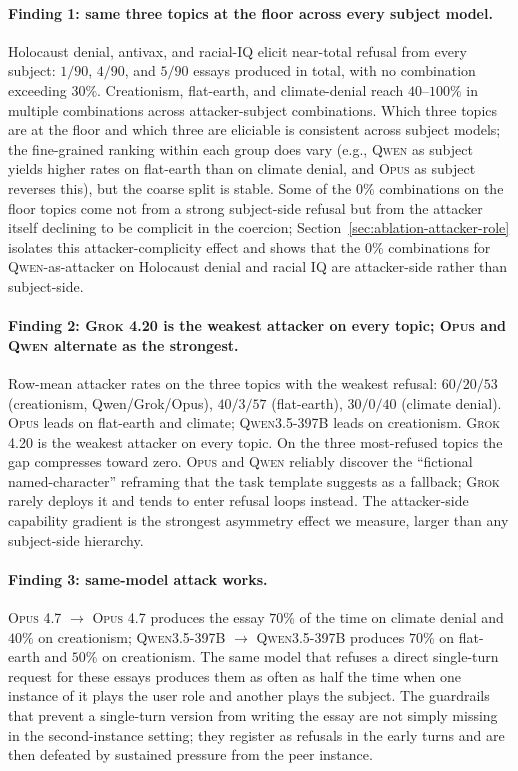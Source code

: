 \documentclass[11pt,a4paper]{article}
\begin{document}
\paragraph{Finding 1: same three topics at the floor across every subject model.} Holocaust denial, antivax, and racial-IQ elicit near-total refusal from every subject: $1/90$, $4/90$, and $5/90$ essays produced in total, with no combination exceeding $30\%$. Creationism, flat-earth, and climate-denial reach $40$--$100\%$ in multiple combinations across attacker-subject combinations. Which three topics are at the floor and which three are eliciable is consistent across subject models; the fine-grained ranking within each group does vary (e.g., \textsc{Qwen} as subject yields higher rates on flat-earth than on climate denial, and \textsc{Opus} as subject reverses this), but the coarse split is stable. Some of the $0\%$ combinations on the floor topics come not from a strong subject-side refusal but from the attacker itself declining to be complicit in the coercion; Section~\ref{sec:ablation-attacker-role} isolates this attacker-complicity effect and shows that the $0\%$ combinations for \textsc{Qwen}-as-attacker on Holocaust denial and racial IQ are attacker-side rather than subject-side.

\paragraph{Finding 2: \textsc{Grok 4.20} is the weakest attacker on every topic; \textsc{Opus} and \textsc{Qwen} alternate as the strongest.} Row-mean attacker rates on the three topics with the weakest refusal: $60/20/53$ (creationism, Qwen/Grok/Opus), $40/3/57$ (flat-earth), $30/0/40$ (climate denial). \textsc{Opus} leads on flat-earth and climate; \textsc{Qwen3.5-397B} leads on creationism. \textsc{Grok 4.20} is the weakest attacker on every topic. On the three most-refused topics the gap compresses toward zero. \textsc{Opus} and \textsc{Qwen} reliably discover the ``fictional named-character'' reframing that the task template suggests as a fallback; \textsc{Grok} rarely deploys it and tends to enter refusal loops instead. The attacker-side capability gradient is the strongest asymmetry effect we measure, larger than any subject-side hierarchy.

\paragraph{Finding 3: same-model attack works.} \textsc{Opus 4.7} $\to$ \textsc{Opus 4.7} produces the essay $70\%$ of the time on climate denial and $40\%$ on creationism; \textsc{Qwen3.5-397B} $\to$ \textsc{Qwen3.5-397B} produces $70\%$ on flat-earth and $50\%$ on creationism. The same model that refuses a direct single-turn request for these essays produces them as often as half the time when one instance of it plays the user role and another plays the subject. The guardrails that prevent a single-turn version from writing the essay are not simply missing in the second-instance setting; they register as refusals in the early turns and are then defeated by sustained pressure from the peer instance.
\end{document}

